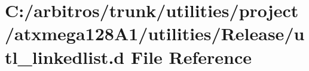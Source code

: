 \hypertarget{utilities_2project_2atxmega128_a1_2utilities_2_release_2utl__linkedlist_8d}{\section{C\-:/arbitros/trunk/utilities/project/atxmega128\-A1/utilities/\-Release/utl\-\_\-linkedlist.d File Reference}
\label{utilities_2project_2atxmega128_a1_2utilities_2_release_2utl__linkedlist_8d}
}
